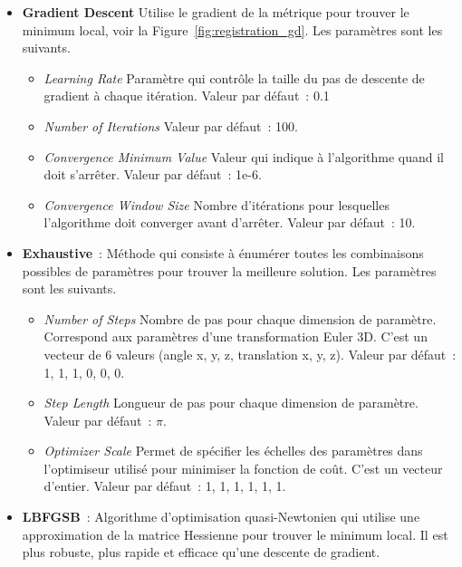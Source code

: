 \documentclass{article}
\begin{document}
{{        \begin{itemize}
            \item \textbf{Gradient Descent} Utilise le gradient de la métrique pour trouver le minimum local, voir la Figure~\ref{fig:registration_gd}. Les paramètres sont les suivants.

            \begin{itemize}
                \item \textit{Learning Rate} Paramètre qui contrôle la taille du pas de descente de gradient à chaque itération. Valeur par défaut~: 0.1

                \item \textit{Number of Iterations} Valeur par défaut~: 100.

                \item \textit{Convergence Minimum Value} Valeur qui indique à l'algorithme quand il doit s'arrêter. Valeur par défaut~: 1e-6.

                \item \textit{Convergence Window Size} Nombre d'itérations pour lesquelles l'algorithme doit converger avant d'arrêter. Valeur par défaut~: 10.
            \end{itemize}

            \item \textbf{Exhaustive}~: Méthode qui consiste à énumérer toutes les combinaisons possibles de paramètres pour trouver la meilleure solution. Les paramètres sont les suivants.

            \begin{itemize}
                \item \textit{Number of Steps} Nombre de pas pour chaque dimension de paramètre. Correspond aux paramètres d'une transformation Euler 3D. C'est un vecteur de 6 valeurs (angle x, y, z, translation x, y, z). Valeur par défaut~: 1, 1, 1, 0, 0, 0.

                \item \textit{Step Length} Longueur de pas pour chaque dimension de paramètre. Valeur par défaut~: $\pi$.

                \item \textit{Optimizer Scale} Permet de spécifier les échelles des paramètres dans l'optimiseur utilisé pour minimiser la fonction de coût. C'est un vecteur d'entier. Valeur par défaut~: 1, 1, 1, 1, 1, 1.
            \end{itemize}

            \item \textbf{LBFGSB}~: Algorithme d'optimisation quasi-Newtonien qui utilise une approximation de la matrice Hessienne pour trouver le minimum local. Il est plus robuste, plus rapide et efficace qu'une descente de gradient.


\end{itemize}}}
\end{document}
